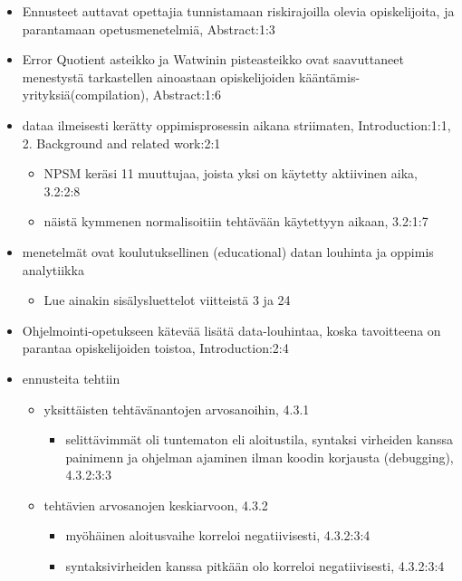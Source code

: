 \documentclass[finnish,twoside,openright]{HYgraduMLDS}
\begin{document}
\begin{itemize}
    \item Ennusteet auttavat opettajia tunnistamaan riskirajoilla olevia opiskelijoita, ja parantamaan opetusmenetelmiä\cite{carter2015normalized}, Abstract:1:3
    \item Error Quotient asteikko\cite{jadud2006methods} ja Watwinin pisteasteikko\cite{watson2014no} ovat saavuttaneet menestystä tarkastellen ainoastaan opiskelijoiden kääntämis-yrityksiä(compilation), Abstract:1:6
    \item dataa ilmeisesti kerätty oppimisprosessin aikana striimaten\cite{carter2015normalized}, Introduction:1:1, 2. Background and related work:2:1
        \begin{itemize}
            \item NPSM keräsi 11 muuttujaa, joista yksi on käytetty aktiivinen aika, 3.2:2:8
            \item näistä kymmenen normalisoitiin tehtävään käytettyyn aikaan, 3.2:1:7
        \end{itemize}
    \item menetelmät ovat koulutuksellinen (educational) datan louhinta ja oppimis analytiikka
    \begin{itemize}
        \item Lue ainakin sisälysluettelot viitteistä 3 ja 24
    \end{itemize}
    \item Ohjelmointi-opetukseen kätevää lisätä data-louhintaa, koska tavoitteena on parantaa opiskelijoiden toistoa, Introduction:2:4
    \item ennusteita tehtiin
    \begin{itemize}
        \item yksittäisten tehtävänantojen arvosanoihin, 4.3.1
        \begin{itemize}
            \item selittävimmät oli tuntematon eli aloitustila, syntaksi virheiden kanssa painimenn ja ohjelman ajaminen ilman koodin korjausta (debugging), 4.3.2:3:3
        \end{itemize}
        \item tehtävien arvosanojen keskiarvoon, 4.3.2
        \begin{itemize}
            \item myöhäinen aloitusvaihe korreloi negatiivisesti, 4.3.2:3:4
            \item syntaksivirheiden kanssa pitkään olo korreloi negatiivisesti, 4.3.2:3:4
        \end{itemize}

\end{itemize}
\end{itemize}
\end{document}
